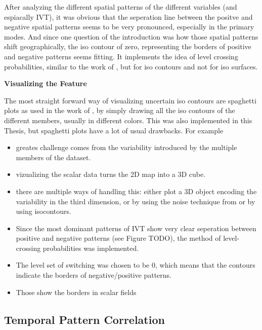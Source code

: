 After analyzing the different spatial patterns of the different variables (and espiacally IVT), it was obvious that the seperation line between the positve and negative spatial patterns seems to be very pronounced, especially in the primary modes. 
And since one question of the introduction was how those spatial patterns shift geographically, the iso contour of zero, representing the borders of positive and negative patterns seems fitting. 
It implements the idea of level crossing probabilities, similar to the work of , but for iso contours and not for iso surfaces.

\textbf{Visualizing the Feature}

The most straight forward way of visualizing uncertain iso contours are spaghetti plots as used in the work of , by simply drawing all the iso contours of the different members, usually in different colors. 
This was also implemented in this Thesis, but spaghetti plots have a lot of usual drawbacks. 
For example 

\begin{itemize}
  \item greates challenge comes from the variability introduced by the multiple members of the dataset. 
  \item vizualizing the scalar data turns the 2D map into a 3D cube. 
  \item there are multiple ways of handling this: either plot a 3D object encoding the variability in the third dimension, or by using the noise technique from  or by using isocontours. 
  \item Since the most dominant patterns of IVT show very clear seperation between positive and negative patterns (see Figure TODO), the method of level-crossing probabilities \cite{poethkow_approximate_2013} was implemented.  
  \item The level set of switching was chosen to be 0, which means that the contours indicate the borders of negative/positive patterns.  \item Those show the borders in scalar fields
\end{itemize}


\subsection{Temporal Pattern Correlation} %
\label{sec:Temporal Pattern Correlation}

